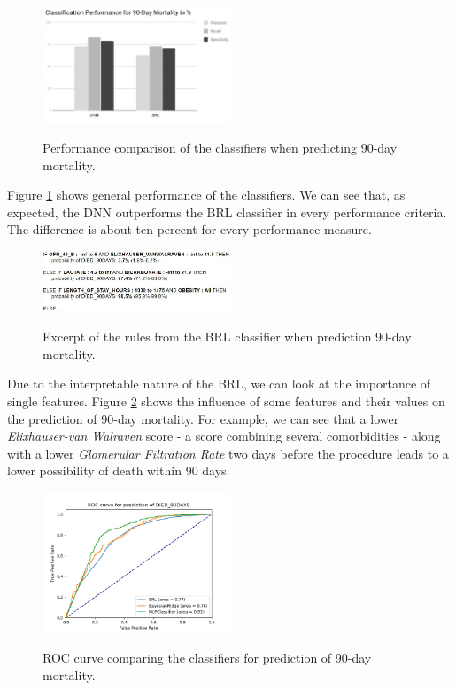 \documentclass[conference,comsoc]{IEEEtran}
\begin{document}
\begin{figure}[h]
	\includegraphics[width=0.5\textwidth]{class_DIED_90DAYS.jpg}
	\label{fig:mortalityCLASS}
	\caption{Performance comparison of the classifiers when predicting 90-day mortality.}
\end{figure}

Figure \ref{fig:mortalityCLASS} shows general performance of the classifiers.
We can see that, as expected, the DNN outperforms the BRL classifier in every performance criteria.
The difference is about ten percent for every performance measure.

\begin{figure}[h]
	\includegraphics[width=0.5\textwidth]{brl_DIED_90DAYS.jpg}
	\label{fig:mortalityBRL}
	\caption{Excerpt of the rules from the BRL classifier when prediction 90-day mortality.}
\end{figure}

Due to the interpretable nature of the BRL, we can look at the importance of single features.
Figure \ref{fig:mortalityBRL} shows the influence of some features and their values on the prediction of 90-day mortality.
For example, we can see that a lower \emph{Elixhauser-van Walraven} score - a score combining several comorbidities - along with a lower \emph{Glomerular Filtration Rate} two days before the procedure leads to a lower possibility of death within 90 days. \\

\begin{figure}[h]
	\includegraphics[width=0.5\textwidth]{ROC_DIED_90DAYS.png}
	\label{fig:mortalityROC}
	\caption{ROC curve comparing the classifiers for prediction of 90-day mortality.}
\end{figure}
\end{document}
